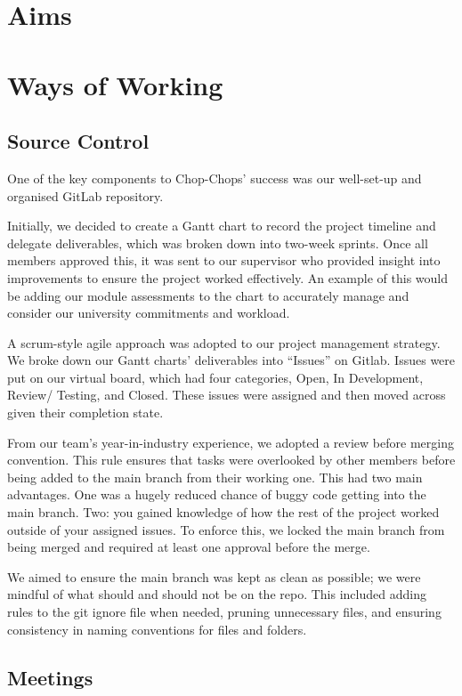 \documentclass{article}
\begin{document}
    \section{Aims}

    \section{Ways of Working}
    \subsection{Source Control}
    One of the key components to Chop-Chops’ success was our well-set-up and organised GitLab repository. 

    Initially, we decided to create a Gantt chart to record the project timeline and delegate deliverables, which was broken down into two-week sprints. Once all members approved this, it was sent to our supervisor who provided insight into improvements to ensure the project worked effectively. An example of this would be adding our module assessments to the chart to accurately manage and consider our university commitments and workload. 

    A scrum-style agile approach was adopted to our project management strategy. We broke down our Gantt charts’ deliverables into “Issues” on Gitlab. Issues were put on our virtual board, which had four categories, Open, In Development, Review/ Testing, and Closed. These issues were assigned and then moved across given their completion state. 

    From our team’s year-in-industry experience, we adopted a review before merging convention. This rule ensures that tasks were overlooked by other members before being added to the main branch from their working one. This had two main advantages. One was a hugely reduced chance of buggy code getting into the main branch. Two: you gained knowledge of how the rest of the project worked outside of your assigned issues. To enforce this, we locked the main branch from being merged and required at least one approval before the merge.

    We aimed to ensure the main branch was kept as clean as possible; we were mindful of what should and should not be on the repo. This included adding rules to the git ignore file when needed, pruning unnecessary files, and ensuring consistency in naming conventions for files and folders.

    \subsection{Meetings}
\end{document}

